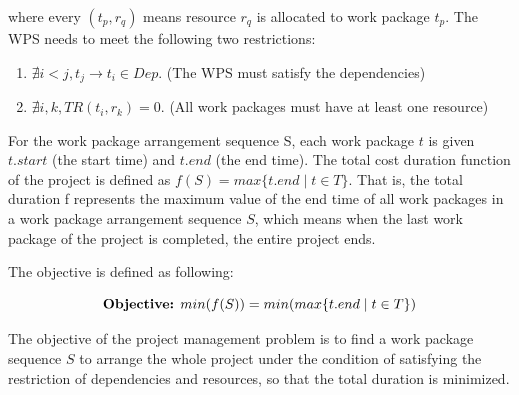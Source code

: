 where every $(t_p, r_q)$ means resource $r_q$ is allocated to work package $t_p$.
The WPS needs to meet the following two restrictions:

\begin{enumerate}
\item $\nexists i < j, t_j \rightarrow t_i \in Dep$.
  (The WPS must satisfy the dependencies)
\item $\nexists i, k, TR(t_i, r_k) = 0$.
  (All work packages must have at least one resource)
\end{enumerate}

For the work package arrangement sequence S, each work package $t$ is given
$t.start$ (the start time) and $t.end$ (the end time).  The total cost duration
function of the project is defined as $f(S) = max\{t.end \mid t \in T\}$. That
is, the total duration f represents the maximum value of the end time of all
work packages in a work package arrangement sequence $S$, which means when the
last work package of the project is completed, the entire project ends.

The objective is defined as following:

\begin{equation}
  \text{\textbf{Objective:}    } min(f(S)) = min(max\{t.end \mid t \in T\})
\end{equation}


The objective of the project management problem is to find a work
package sequence $S$ to arrange the whole project under the condition
of satisfying the restriction of dependencies and resources, so that
the total duration is minimized.


